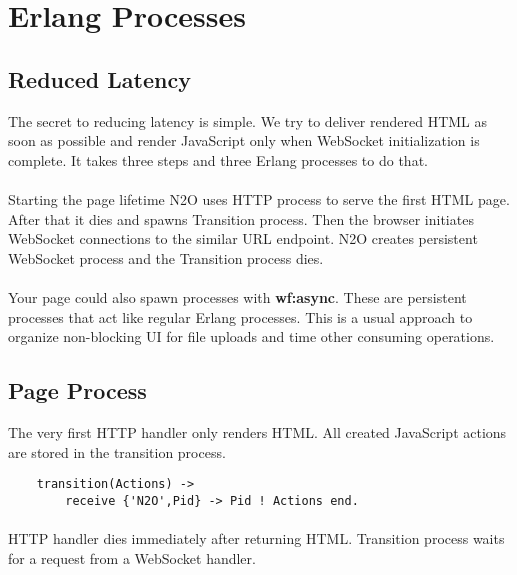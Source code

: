 \section{Erlang Processes}

\subsection{Reduced Latency}
The secret to reducing latency is simple. We try to deliver rendered HTML
as soon as possible and render JavaScript only when WebSocket initialization is complete.
It takes three steps and three Erlang processes to do that.


\paragraph{}
Starting the page lifetime N2O uses HTTP process to serve the first HTML page.
After that it dies and spawns Transition process.
Then the browser initiates WebSocket connections to the similar URL endpoint.
N2O creates persistent WebSocket process and the Transition process dies.

\paragraph{}
Your page could also spawn processes with {\bf wf:async}.
These are persistent processes that act like regular Erlang processes.
This is a usual approach to organize non-blocking UI for file uploads and time other consuming operations.

\newpage
\subsection{Page Process}
The very first HTTP handler only renders HTML. All created
JavaScript actions are stored in the transition process.

\vspace{1\baselineskip}
\begin{lstlisting}
    transition(Actions) ->
        receive {'N2O',Pid} -> Pid ! Actions end.
\end{lstlisting}

\paragraph{}
HTTP handler dies immediately after returning HTML. Transition process
waits for a request from a WebSocket handler.


